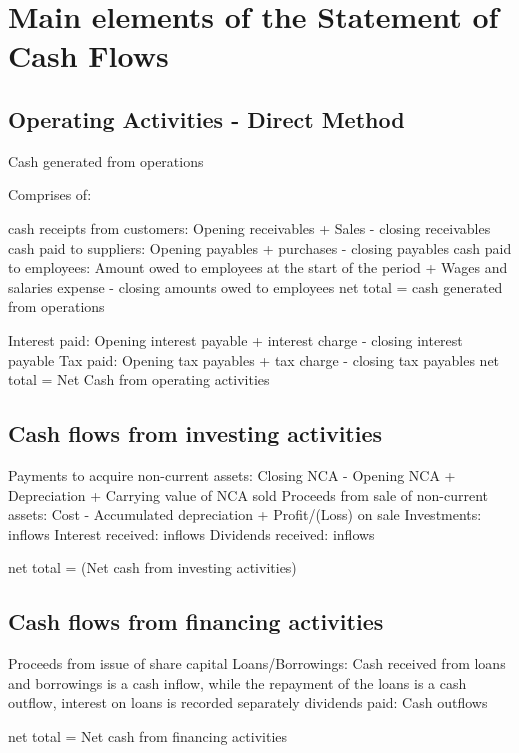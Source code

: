 \section{Main elements of the Statement of Cash Flows}


\subsection{Operating Activities - Direct Method}


Cash generated from operations 

Comprises of:

cash receipts from customers: Opening receivables + Sales - closing receivables 
cash paid to suppliers: Opening payables +  purchases - closing payables 
cash paid to employees: Amount owed to employees at the start of the period + Wages and salaries expense - closing amounts owed to employees
net total = cash generated from operations 

Interest paid: Opening interest payable + interest charge - closing interest payable 
Tax paid: Opening tax payables + tax charge - closing tax payables 
net total = Net Cash from operating activities 


\subsection{Cash flows from investing activities} 

Payments to acquire non-current assets: Closing NCA - Opening NCA + Depreciation + Carrying value of NCA sold  
Proceeds from sale of non-current assets: Cost - Accumulated depreciation + Profit/(Loss) on sale   
Investments: inflows  
Interest received: inflows 
Dividends received: inflows 

net total = (Net cash from investing activities)

\subsection{Cash flows from financing activities} 

Proceeds from issue of share capital 
Loans/Borrowings: Cash received from loans and borrowings is a cash inflow, while the repayment of the loans is a cash outflow, interest on loans is recorded separately
dividends paid: Cash outflows 

net total = Net cash from financing activities
